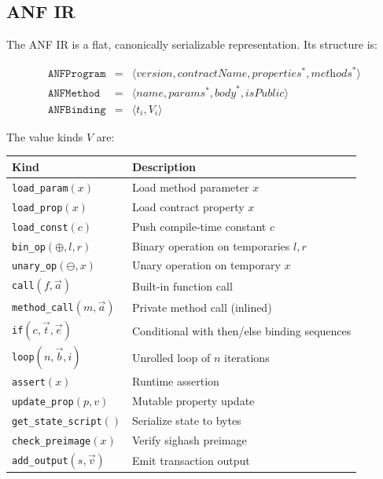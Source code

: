 \documentclass[11pt,a4paper]{article}
\begin{document}
\subsection{ANF IR}
\label{sec:ir-anf}

The ANF IR is a flat, canonically serializable representation. Its structure
is:

\[
\begin{array}{rcl}
\texttt{ANFProgram} &=& \langle \textit{version}, \textit{contractName}, \textit{properties}^*, \textit{methods}^* \rangle \\
\texttt{ANFMethod} &=& \langle \textit{name}, \textit{params}^*, \textit{body}^*, \textit{isPublic} \rangle \\
\texttt{ANFBinding} &=& \langle t_i, V_i \rangle
\end{array}
\]

The value kinds $V$ are:

\begin{center}
\small
\begin{tabular}{@{}ll@{}}
\toprule
\textbf{Kind} & \textbf{Description} \\
\midrule
\texttt{load\_param}$(x)$ & Load method parameter $x$ \\
\texttt{load\_prop}$(x)$ & Load contract property $x$ \\
\texttt{load\_const}$(c)$ & Push compile-time constant $c$ \\
\texttt{bin\_op}$(\oplus, l, r)$ & Binary operation on temporaries $l, r$ \\
\texttt{unary\_op}$(\ominus, x)$ & Unary operation on temporary $x$ \\
\texttt{call}$(f, \vec{a})$ & Built-in function call \\
\texttt{method\_call}$(m, \vec{a})$ & Private method call (inlined) \\
\texttt{if}$(c, \vec{t}, \vec{e})$ & Conditional with then/else binding sequences \\
\texttt{loop}$(n, \vec{b}, i)$ & Unrolled loop of $n$ iterations \\
\texttt{assert}$(x)$ & Runtime assertion \\
\texttt{update\_prop}$(p, v)$ & Mutable property update \\
\texttt{get\_state\_script}$ ()$ & Serialize state to bytes \\
\texttt{check\_preimage}$(x)$ & Verify sighash preimage \\
\texttt{add\_output}$(s, \vec{v})$ & Emit transaction output \\
\bottomrule
\end{tabular}
\end{center}
\end{document}
